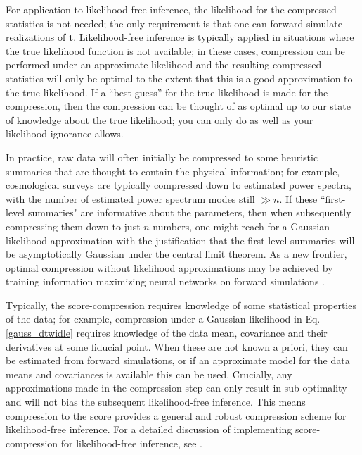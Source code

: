 \documentclass[fleqn,usenatbib]{mnras}
\begin{document}
For application to likelihood-free inference, the likelihood for the compressed statistics is not needed; the only requirement is that one can forward simulate realizations of $\mathbf{t}$. Likelihood-free inference is typically applied in situations where the true likelihood function is not available; in these cases, compression can be performed under an approximate likelihood and the resulting compressed statistics will only be optimal to the extent that this is a good approximation to the true likelihood. If a ``best guess'' for the true likelihood is made for the compression, then the compression can be thought of as optimal up to our state of knowledge about the true likelihood; you can only do as well as your likelihood-ignorance allows. 

In practice, raw data will often initially be compressed to some heuristic summaries that are thought to contain the physical information; for example, cosmological surveys are typically compressed down to estimated power spectra, with the number of estimated power spectrum modes still $\gg n$. If these ``first-level summaries" are informative about the parameters, then when subsequently compressing them down to just $n$-numbers, one might reach for a Gaussian likelihood approximation with the justification that the first-level summaries will be asymptotically Gaussian under the central limit theorem. As a new frontier, optimal compression without likelihood approximations may be achieved by training information maximizing neural networks on forward simulations \citep{Charnock2018}.

Typically, the score-compression requires knowledge of some statistical properties of the data; for example, compression under a Gaussian likelihood in Eq. \eqref{gauss_dtwidle} requires knowledge of the data mean, covariance and their derivatives at some fiducial point. When these are not known a priori, they can be estimated from forward simulations, or if an approximate model for the data means and covariances is available this can be used. Crucially, any approximations made in the compression step can only result in sub-optimality and will not bias the subsequent likelihood-free inference. This means compression to the score provides a general and robust compression scheme for likelihood-free inference. For a detailed discussion of implementing score-compression for likelihood-free inference, see \citet{Alsing2018a}.
%
\end{document}
